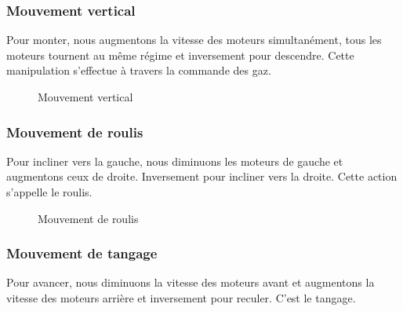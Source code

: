 \subsubsection{Mouvement vertical}
Pour monter, nous augmentons la vitesse des moteurs simultanément, tous les moteurs tournent au même régime et inversement pour descendre. Cette manipulation s'effectue à travers la commande des gaz.
\begin{figure} [H]
\begin{center}
	\centering
\end{center}
\caption{Mouvement vertical}
\end{figure}

\subsubsection{Mouvement de roulis}
Pour incliner vers la gauche, nous diminuons les moteurs de gauche et augmentons ceux de droite. Inversement pour incliner vers la droite. Cette action s'appelle le roulis.
\begin{figure} [H]
\begin{center}
	
	\caption{Mouvement de roulis}
\end{center}
\end{figure}
\subsubsection{Mouvement de tangage}
Pour avancer, nous diminuons la vitesse des moteurs avant et augmentons la vitesse des moteurs arrière et inversement pour reculer. C'est le tangage.


